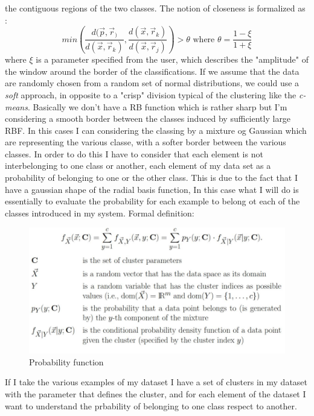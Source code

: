 \documentclass{article}
\begin{document}
the contiguous regions of the two classes. The notion of closeness is formalized as :
$$min\left(\frac{d(\vec{p},\vec{r}_)}{d(\vec{x},\vec{r}_k)},\frac{d(\vec{x},\vec{r}_k)}{d(\vec{x},\vec{r}_j)}\right) > \theta
    \text{ where } \theta=\frac{1-\xi}{1+\xi}$$
where $\xi$ is a parameter specified from the user, which describes the "amplitude" of the window
around the border of the classifications. If we assume that the data are randomly chosen from
a random set of normal distributions, we could use a \textit{soft} approach, in opposite to a "crisp"
division typical of the clustering like the \textit{c-means}. Basically we don't have a RB function
which is rather sharp but I'm considering a smooth border between the classes induced by
sufficiently large RBF. In this cases I can considering the classing by a mixture og
Gaussian which are representing the various classe, with a softer border between
the various classes.
\newline\newline
In order to do this I have to consider that each element is not interbelonging
to one class or another, each element of my data set as a probability of belonging to one or the other class.
This is due to the fact that I have a gaussian shape of the radial basis function,
In this case what I will do is essentially to evaluate the probability for each example to
belong ot each of the classes introduced in my system. Formal definition:
\begin{figure}[H]
    \centering
    \includegraphics[scale=0.4]{images/formal_prob_func.png}
    \caption{Probability function}
\end{figure}
If I take the various examples of my dataset I have a set of clusters in my dataset with the parameter that defines
the cluster, and for each element of the dataset I want to understand the prbability of belonging to
one class respect to another.
\newline\newline
\end{document}
